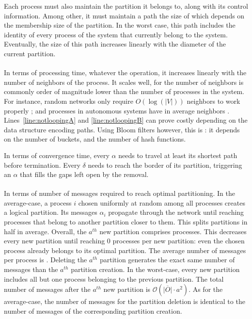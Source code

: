 \noindent Each process must also maintain the partition it belongs to,
along with its control information. Among other, it must maintain a
path the size of which depends on the membership size of the
partition. In the worst case, this path includes the identity of every
process of the system that currently belong to the system. Eventually,
the size of this path increases linearly with the diameter of the
current partition. 

\paragraph{}
In terms of processing time, whatever the operation, it increases
linearly with the number of neighbors of the process. It scales well,
for the number of neighbors is commonly order of magnitude lower than
the number of processes in the system. For instance, random networks
only require $O(\log(|V|))$ neighbors to work properly \REF; and
processes in autonomous systems have in average  neighbors
\REF. Lines~\ref{line:notloopingA} and \ref{line:notloopingB} can
prove costly depending on the data structure encoding paths. Using
Bloom filters however, this is : it depends on the
number of buckets, and the number of hash functions.

\noindent In terms of convergence time, every $\alpha$ needs to travel
at least its shortest path before termination. Every $\delta$ needs to
reach the border of its partition, triggering an $\alpha$ that fills
the gaps left open by the removal. 

\paragraph{}
In terms of number of messages required to reach optimal
partitioning. In the average-case, a process $i$ chosen uniformly at
random among all processes creates a logical partition. Its messages
$\alpha_i$ propagate through the network until reaching processes that
belong to another partition closer to them. This splits partitions in
half in average. Overall, the $a^{th}$ new partition comprises
processes. This decreases every new partition until reaching $0$
processes per new partition: even the chosen process already belongs
to its optimal partition. The average number of messages per process
is .  Deleting the
$a^{th}$ partition generates the exact same number of messages than
the $a^{th}$ partition creation.  In the
worst-case, every new partition includes all but one process belonging
to the previous partition. The total number of messages after the
$a^{th}$ new partition is $\mathcal{O}(\overline{|O|}\cdot a^2)$. As
for the average-case, the number of messages for the partition
deletion is identical to the number of messages of the corresponding
partition creation.

\noindent {}



